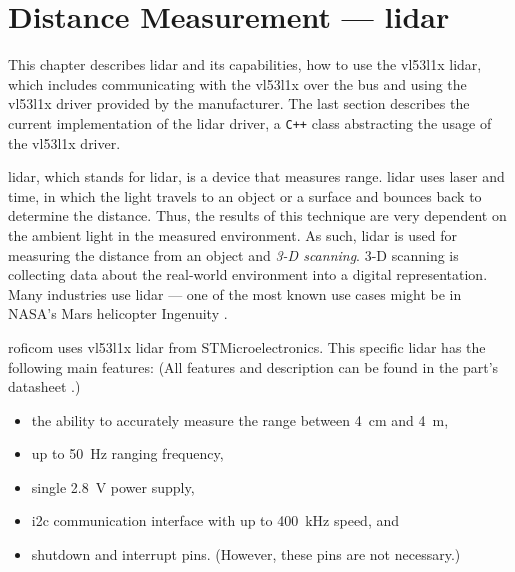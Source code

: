 \documentclass[
  digital,     %
  oneside,     %
  nosansbold,  %
  nocolorbold, %
  nolof,         %
  nolot,         %
]{fithesis4}
\newcommand{\TODO}[1]{\textcolor{red}{\textit{#1}}}
\newcommand{\TODOLIST}[1]{}
\begin{document}
{{{\chapter[ Distance Measurement --- LiDAR ]{ Distance Measurement --- \acrshort{lidar} } \label{sec:lidar}
\TODOLIST{
\begin{itemize}
    \item \TODO{Walk through \acrshort{lidar} features}
    \item \TODO{Communicating by \acrshort{i2c}}
    \item \TODO{\acrshort{lidar} protocol}
\end{itemize}
}
This chapter describes \acrshort{lidar} and its capabilities, how to use the \gls{vl53l1x} \acrshort{lidar}, which includes communicating with the \gls{vl53l1x} over the bus and using the \gls{vl53l1x} driver provided by the manufacturer. The last section describes the current implementation of the \acrshort{lidar} driver, a \verb|C++| class abstracting the usage of the \gls{vl53l1x} driver.  

\acrshort{lidar}, which stands for \acrlong{lidar}, is a device that measures range. \acrshort{lidar} uses laser and time, in which the light travels to an object or a surface and bounces back to determine the distance. Thus, the results of this technique are very dependent on the ambient light in the measured environment. As such, \acrshort{lidar} is used for measuring the distance from an object and \emph{3-D scanning}. 3-D scanning is collecting data about the real-world environment into a digital representation. Many industries use \acrshort{lidar} --- one of the most known use cases might be in NASA's Mars helicopter Ingenuity \cite{garmin-lidar}.

\acrshort{roficom} uses \gls{vl53l1x} \acrshort{lidar} from STMicroelectronics. This specific \acrshort{lidar} has the following main features: (All features and description can be found in the part's datasheet \cite{vl53l1x}.)

\begin{itemize}
    \item the ability to accurately measure the range between \qty{4}{\centi\metre} and \qty{4}{\metre},
    \item up to \qty{50}{\hertz} ranging frequency,
    \item single \qty{2.8}{\volt} power supply,
    \item \acrshort{i2c} communication interface with up to \qty{400}{\kilo\hertz} speed, and
    \item shutdown and interrupt pins. (However, these pins are not necessary.)
\end{itemize}

}}}
\end{document}
